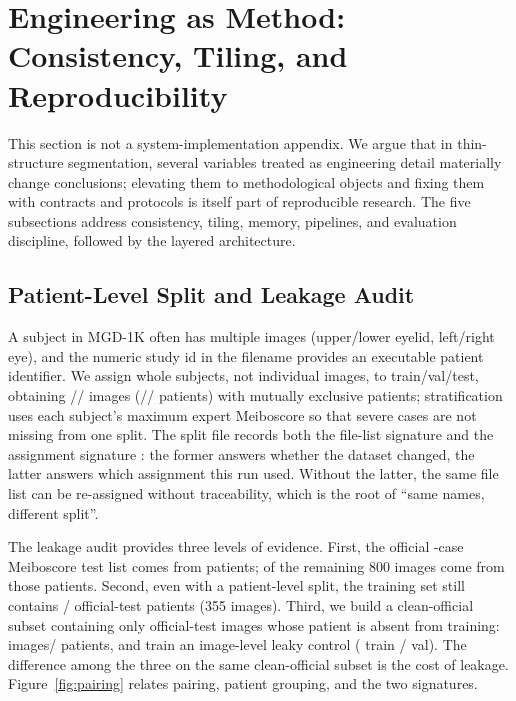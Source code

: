\section{Engineering as Method: Consistency, Tiling, and Reproducibility}\label{sec:engineering}

This section is not a system-implementation appendix. We argue that in thin-structure segmentation, several variables treated as engineering detail materially change conclusions; elevating them to methodological objects and fixing them with contracts and protocols is itself part of reproducible research. The five subsections address consistency, tiling, memory, pipelines, and evaluation discipline, followed by the layered architecture.

\subsection{Patient-Level Split and Leakage Audit}\label{sec:leakage}

A subject in MGD-1K often has multiple images (upper/lower eyelid, left/right eye), and the numeric study id in the filename provides an executable patient identifier. We assign whole subjects, not individual images, to train/val/test, obtaining \nTrain/\nVal/\nTest{} images (\nTrainPatients/\nValPatients/\nTestPatients{} patients) with mutually exclusive patients; stratification uses each subject's maximum expert Meiboscore so that severe cases are not missing from one split. The split file records both the file-list signature \splitSig{} and the assignment signature \assignmentSig{}: the former answers whether the dataset changed, the latter answers which assignment this run used. Without the latter, the same file list can be re-assigned without traceability, which is the root of ``same names, different split''.

The leakage audit provides three levels of evidence. First, the official \officialTestImages-case Meiboscore test list comes from \officialTestPatients{} patients; \officialLeakImages{} of the remaining 800 images come from those patients. Second, even with a patient-level split, the \nTrain{} training set still contains \officialLeakPatients/\officialTestPatients{} official-test patients (355 images). Third, we build a clean-official subset containing only official-test images whose patient is absent from training: \cleanOfficialImages{} images/\cleanOfficialPatients{} patients, and train an image-level leaky control (\leakyTrainImages{} train / \leakyValImages{} val). The difference among the three on the same clean-official subset is the cost of leakage. Figure~\ref{fig:pairing} relates pairing, patient grouping, and the two signatures.

